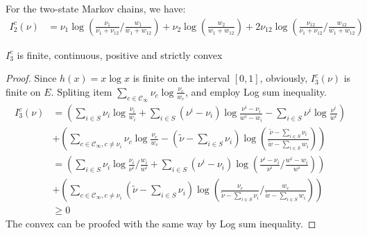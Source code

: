 \documentclass[11pt,en,cite=authoryear]{elegantpaper}
\begin{document}
\begin{corollary}
    For the two-state Markov chains, we have:
    \begin{align*}
    I_2^c(\nu) &= \nu_{1}\log(\frac{\nu_{1}}{\nu_{1}+\nu_{12}}/\frac{w_{1}}{w_{1}+w_{12}}) + \nu_{2}\log(\frac{w_{2}}{w_{1}+w_{12}}) + 2\nu_{12} \log (\frac{\nu_{12}}{\nu_{1}+\nu_{12}}/\frac{w_{12}}{w_{1}+w_{12}})
\end{align*}
\end{corollary}

\begin{corollary}
    $I_3^c$ is  finite, continuous, positive and strictly convex
\end{corollary}
\begin{proof}
    Since $h(x) = x \log x$ is finite on the interval $[0, 1]$, obviously, $I^c_3(\nu)$ is finite on $E$.
    Spliting item $\sum_{c \in \mathcal{C}_{\infty}} \nu_{c} \log \frac{\nu_{c}}{w_c}$, and employ Log sum inequality.
    \begin{align*}
        I^c_3(\nu) 
        &= \left(\sum_{i\in S} \nu_{i}\log \frac{\nu_{i}}{w_i} + \sum_{i\in S}(\nu^i - \nu_i)\log \frac{\nu^i - \nu_i}{w^i - w_i} 
        - \sum_{i\in S} \nu^i \log \frac{\nu^i}{w^i} \right)\\
        &+ \left(\sum_{c \in \mathcal{C}_{\infty}, c\neq \nu_{i}} \nu_{c} \log \frac{\nu_{c}}{w_c} 
        -(\tilde{\nu} - \sum_{i\in S}\nu_i)\log(\frac{\tilde{\nu} - \sum_{i\in S}\nu_i}{\tilde{w} - \sum_{i\in S}w_i}) \right)\\
        &= \left(\sum_{i\in S} \nu_{i}\log \frac{\nu_{i}}{\nu^i}/ \frac{w_{i}}{w^i}+ \sum_{i\in S}(\nu^i - \nu_i)\log (\frac{\nu^i - \nu_i}{\nu^i} / \frac{w^i - w_i}{w^i}) \right)\\
        &+ \left(\sum_{c \in \mathcal{C}_{\infty}, c\neq \nu_{i}} (\tilde{\nu} - \sum_{i\in S}\nu_i) \log (\frac{\nu_{c}}{\tilde{\nu} - \sum_{i\in S}\nu_i} / \frac{w_{c}}{\tilde{w} - \sum_{i\in S}w_{i}}) \right)\\
        &\ge 0
    \end{align*}
    The convex can be proofed with the same way by Log sum inequality.
\end{proof}
\end{document}
